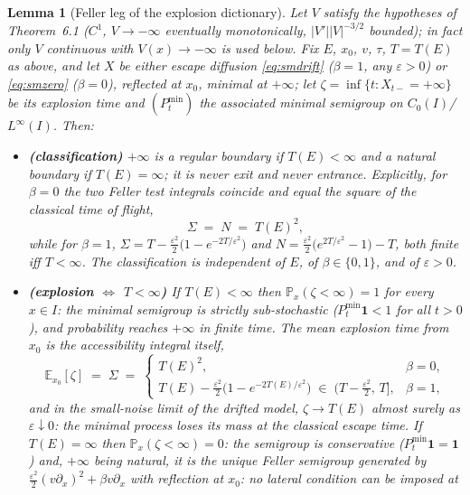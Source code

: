 \documentclass[11pt]{article}
\newtheorem{lemma}{Lemma}
\theoremstyle{remark}
\newcommand{\E}{\mathbb{E}}
\newcommand{\Prob}{\mathbb{P}}
\begin{document}
\begin{lemma}[Feller leg of the explosion dictionary]
\label{lem:feller}
Let $V$ satisfy the hypotheses of Theorem~6.1 ($C^{1}$, $V\to-\infty$
eventually monotonically, $|V'||V|^{-3/2}$ bounded); in fact only
$V$ continuous with $V(x)\to-\infty$ is used below.  Fix $E$, $x_{0}$,
$v$, $\tau$, $T=T(E)$ as above, and let $X$ be either escape diffusion
\eqref{eq:smdrift} ($\beta=1$, any $\varepsilon>0$) or
\eqref{eq:smzero} ($\beta=0$), reflected at $x_{0}$, minimal at
$+\infty$; let $\zeta=\inf\{t:X_{t-}=+\infty\}$ be its explosion time
and $(P^{\min}_{t})$ the associated minimal semigroup on
$C_{0}(I)$/$L^{\infty}(I)$.  Then:
\begin{itemize}
\item[(i)] \textbf{(classification)} $+\infty$ is a \emph{regular}
boundary if $T(E)<\infty$ and a \emph{natural} boundary if
$T(E)=\infty$; it is never exit and never entrance.  Explicitly, for
$\beta=0$ the two Feller test integrals coincide and equal the square
of the classical time of flight,
\[
\Sigma\;=\;N\;=\;T(E)^{2},
\]
while for $\beta=1$,
$\Sigma=T-\tfrac{\varepsilon^{2}}{2}\bigl(1-e^{-2T/\varepsilon^{2}}\bigr)$
and $N=\tfrac{\varepsilon^{2}}{2}\bigl(e^{2T/\varepsilon^{2}}-1\bigr)-T$,
both finite iff $T<\infty$.  The classification is independent of
$E$, of $\beta\in\{0,1\}$, and of $\varepsilon>0$.
\item[(ii)] \textbf{(explosion $\Leftrightarrow$ $T<\infty$)}  If
$T(E)<\infty$ then $\Prob_{x}(\zeta<\infty)=1$ for every $x\in I$:
the minimal semigroup is strictly sub-stochastic
($P^{\min}_{t}\mathbf 1<1$ for all $t>0$), and probability reaches
$+\infty$ in finite time.  The mean explosion time from $x_{0}$ is the
accessibility integral itself,
\[
\E_{x_{0}}[\zeta]\;=\;\Sigma\;=\;
\begin{cases}
T(E)^{2}, & \beta=0,\\[2pt]
T(E)-\tfrac{\varepsilon^{2}}{2}
\bigl(1-e^{-2T(E)/\varepsilon^{2}}\bigr)\;\in\;
\bigl(T-\tfrac{\varepsilon^{2}}{2},\,T\bigr], & \beta=1,
\end{cases}
\]
and in the small-noise limit of the drifted model,
$\zeta\to T(E)$ almost surely as $\varepsilon\downarrow0$: the minimal
process loses its mass at the classical escape time.  If $T(E)=\infty$
then $\Prob_{x}(\zeta<\infty)=0$: the semigroup is conservative
($P^{\min}_{t}\mathbf 1=\mathbf 1$) and, $+\infty$ being natural, it is
the \emph{unique} Feller semigroup generated by
$\tfrac{\varepsilon^{2}}{2}(v\partial_{x})^{2}+\beta v\partial_{x}$
with reflection at $x_{0}$: no lateral condition can be imposed at

\end{itemize}
\end{lemma}
\end{document}
